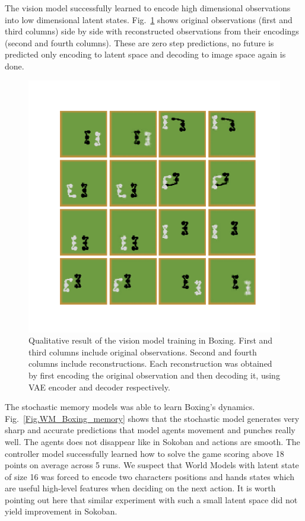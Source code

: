 The vision model successfully learned to encode high dimensional observations into low dimensional latent states. Fig.~\ref{Fig.WM_Boxing_vision} shows original observations (first and third columns) side by side with reconstructed observations from their encodings (second and fourth columns). These are zero step predictions, no future is predicted only encoding to latent space and decoding to image space again is done.

\begin{figure}[H]
\includegraphics[width=1\textwidth,keepaspectratio]{figures/Boxing_vision.png}
\caption[Qualitative result of the World Models vision model training in Boxing]{Qualitative result of the vision model training in Boxing. First and third columns include original observations. Second and fourth columns include reconstructions. Each reconstruction was obtained by first encoding the original observation and then decoding it, using VAE encoder and decoder respectively.}
\label{Fig.WM_Boxing_vision}
\end{figure}

The stochastic memory models was able to learn Boxing’s dynamics. Fig.~\ref{Fig.WM_Boxing_memory} shows that the stochastic model generates very sharp and accurate predictions that model agents movement and punches really well. The agents does not disappear like in Sokoban and actions are smooth.
The controller model successfully learned how to solve the game scoring above 18 points on average across 5 runs. We suspect that World Models with latent state of size 16 was forced to encode two characters positions and hands states which are useful high-level features when deciding on the next action. It is worth pointing out here that similar experiment with such a small latent space did not yield improvement in Sokoban.

